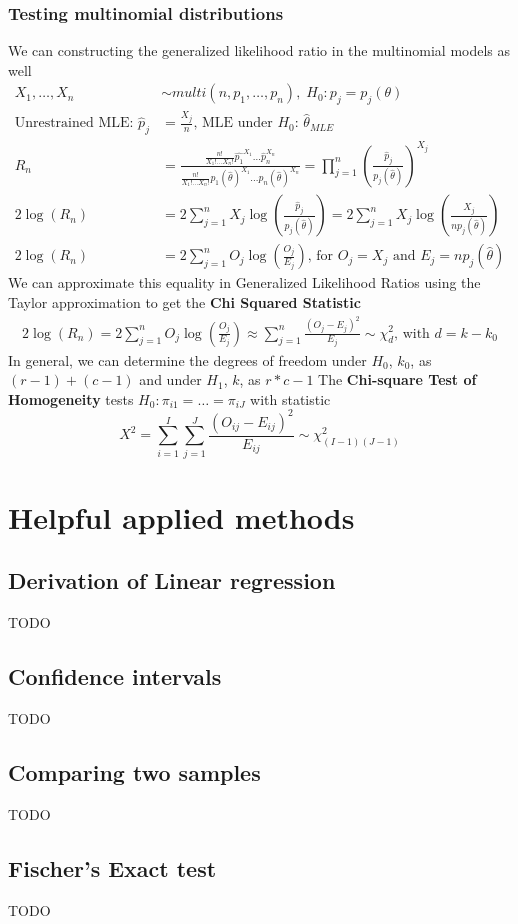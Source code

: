 \documentclass{article}
\begin{document}
\subsubsection{Testing multinomial distributions}
We can constructing the generalized likelihood ratio in the multinomial models as well
\begin{align*}
    X_1, \dots, X_n &\sim multi(n, p_1, \dots, p_n), \; H_0: p_j = p_j(\theta)
    \\
    \textrm{Unrestrained MLE: } \hat{p}_j &= \frac{X_j}{n} \textrm{, MLE under $H_0$: } \hat{\theta}_{MLE}\\
    R_n &= \frac{\frac{n!}{X_1!\dots X_n!}\hat{p_1}^{X_1}\dots\hat{p}_n^{X_n}}{\frac{n!}{X_1!\dots X_n!}p_1(\hat{\theta})^{X_1} \dots p_n(\hat{\theta})^{X_n}} = \prod_{j=1}^n \left(\frac{\hat{p}_j}{p_j(\hat{\theta})} \right)^{X_j}\\
    2\log(R_n) &= 2 \sum_{j=1}^n X_j\log\left(\frac{\hat{p}_j}{p_j(\hat{\theta})} \right) = 2 \sum_{j=1}^n X_j\log\left(\frac{X_j}{np_j(\hat{\theta})}\right)\\
    2\log(R_n) &= 2\sum_{j=1}^nO_j\log\left(\frac{O_j}{E_j}\right) \textrm{, for } O_j=X_j \textrm{ and } E_j = np_j(\hat{\theta})
\end{align*}
We can approximate this equality in Generalized Likelihood Ratios using the Taylor approximation to get the \textbf{Chi Squared Statistic}
\begin{align*}
    2\log(R_n) = 2\sum_{j=1}^nO_j\log\left(\frac{O_j}{E_j}\right) \approx \sum_{j=1}^n \frac{(O_j-E_j)^2}{E_j} \sim \chi^2_d \textrm{, with } d = k - k_0
\end{align*}
In general, we can determine the degrees of freedom under $H_0$, $k_0$, as $(r-1) + (c-1)$ and under $H_1$, $k$, as $r*c-1$
The \textbf{Chi-square Test of Homogeneity} tests $H_0: \pi_{i1} = \dots = \pi_{iJ}$ with statistic
\begin{equation*}
    X^2 = \sum_{i=1}^I \sum_{j=1}^J \frac{(O_{ij} - E_{ij})^2}{E_{ij}} \sim \chi^2_{(I-1)(J-1)}
\end{equation*}

\section{Helpful applied methods}
\subsection{Derivation of Linear regression}
TODO
\subsection{Confidence intervals}
TODO
\subsection{Comparing two samples}
TODO
\subsection{Fischer's Exact test}
TODO
\end{document}
